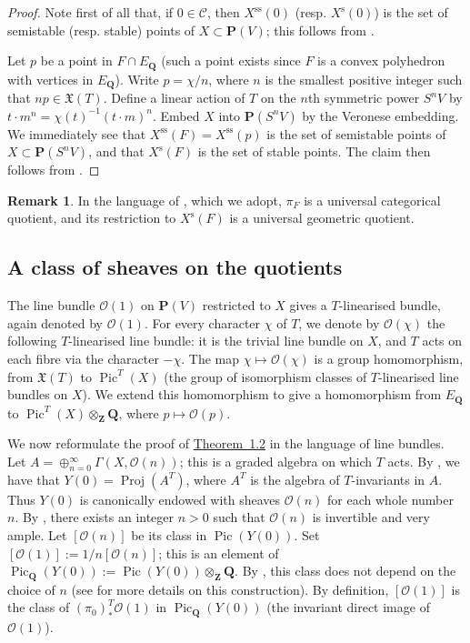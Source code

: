 \documentclass{article}
\theoremstyle{plain}
\theoremstyle{definition}
\newtheorem*{remark}{Remark}
\newcommand{\sh}[1]{{\mathscr{#1}}}
\newcommand{\PP}{\mathbf{P}}
\newcommand{\QQ}{\mathbf{Q}}
\newcommand{\ZZ}{\mathbf{Z}}
\newcommand{\s}{\mathrm{s}}
\renewcommand{\ss}{\mathrm{ss}}
\DeclareMathOperator{\Pic}{Pic}
\DeclareMathOperator{\Proj}{Proj}
\begin{document}
\begin{proof}
  Note first of all that, if $0\in\mathcal{C}$, then $X^\ss(0)$ (resp. $X^\s(0)$) is the set of semistable (resp. stable) points of $X\subset\PP(V)$;
  this follows from \cite[Theorem~2.1]{MF}.

  Let $p$ be a point in $F\cap E_\QQ$ (such a point exists since $F$ is a convex polyhedron with vertices in $E_\QQ$).
  Write $p=\chi/n$, where $n$ is the smallest positive integer such that $np\in\mathfrak{X}(T)$.
  Define a linear action of $T$ on the $n$th symmetric power $S^nV$ by $t\cdot m^n = \chi(t)^{-1}(t\cdot m)^n$.
  Embed $X$ into $\PP(S^nV)$ by the Veronese embedding.
  We immediately see that $X^\ss(F)=X^\ss(p)$ is the set of semistable points of $X\subset\PP(S^nV)$, and that $X^\s(F)$ is the set of stable points.
  The claim then follows from \cite[1.4]{MF}.
\end{proof}

\begin{remark}
  In the language of \cite[Chapter~1]{MF}, which we adopt, $\pi_F$ is a universal categorical quotient, and its restriction to $X^\s(F)$ is a universal geometric quotient.
\end{remark}


\subsection{A class of sheaves on the quotients}
\label{1.3}

The line bundle $\sh{O}(1)$ on $\PP(V)$ restricted to $X$ gives a $T$-linearised bundle, again denoted by $\sh{O}(1)$.
For every character $\chi$ of $T$, we denote by $\sh{O}(\chi)$ the following $T$-linearised line bundle:
it is the trivial line bundle on $X$, and $T$ acts on each fibre via the character $-\chi$.
The map $\chi\mapsto\sh{O}(\chi)$ is a group homomorphism, from $\mathfrak{X}(T)$ to $\Pic^T(X)$ (the group of isomorphism classes of $T$-linearised line bundles on $X$).
We extend this homomorphism to give a homomorphism from $E_\QQ$ to $\Pic^T(X)\otimes_\ZZ\QQ$, where $p\mapsto\sh{O}(p)$.

We now reformulate the proof of \hyperref[1.2-theorem]{Theorem~1.2} in the language of line bundles.
Let $A=\oplus_{n=0}^\infty\Gamma(X,\sh{O}(n))$;
this is a graded algebra on which $T$ acts.
By \cite[1.11]{MF}, we have that $Y(0)=\Proj(A^T)$, where $A^T$ is the algebra of $T$-invariants in $A$.
Thus $Y(0)$ is canonically endowed with sheaves $\sh{O}(n)$ for each whole number $n$.
By \cite[8.14.4]{EGAII}, there exists an integer $n>0$ such that $\sh{O}(n)$ is invertible and very ample.
Let $[\sh{O}(n)]$ be its class in $\Pic(Y(0))$.
Set $[\sh{O}(1)] := 1/n[\sh{O}(n)]$;
this is an element of $\Pic_\QQ(Y(0)) := \Pic(Y(0))\otimes_\ZZ\QQ$.
By \cite[8.14.12]{EGAII}, this class does not depend on the choice of $n$ (see \cite{Dem} for more details on this construction).
By definition, $[\sh{O}(1)]$ is the class of $(\pi_0)_*^T\sh{O}(1)$ in $\Pic_\QQ(Y(0))$ (the invariant direct image of $\sh{O}(1)$).
\end{document}
